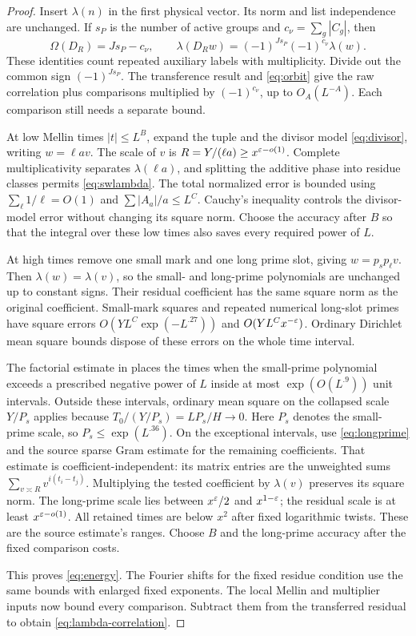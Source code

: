 \begin{proof}
Insert $\lambda(n)$ in the first physical vector. Its norm and
list independence are unchanged. If $s_P$ is the number of active
groups and $c_\nu=\sum_g|C_g|$, then
\[
 \Omega(D_R)=Js_P-c_\nu,\qquad
 \lambda(D_Rw)=(-1)^{Js_P}(-1)^{c_\nu}\lambda(w).
\]
These identities count repeated auxiliary labels with multiplicity.
Divide out the common sign $(-1)^{Js_P}$. The transference result
and \eqref{eq:orbit} give the raw correlation plus comparisons
multiplied by $(-1)^{c_\nu}$, up to $O_A(L^{-A})$.
Each comparison still needs a separate bound.

At low Mellin times $|t|\leq L^B$, expand the tuple and the divisor
model \eqref{eq:divisor}, writing $w=\ell av$.
The scale of $v$ is $R=Y/(\ell a)\geq x^{\varepsilon-o(1)}$.
Complete multiplicativity separates $\lambda(\ell a)$, and splitting
the additive phase into residue classes permits \eqref{eq:swlambda}.
The total normalized error is bounded using
$\sum_{\boldsymbol\ell}1/\ell=O(1)$ and
$\sum|A_a|/a\leq L^C$. Cauchy's inequality controls the divisor-model
error without changing its square norm. Choose the accuracy after
$B$ so that the integral over these low times also saves every
required power of $L$.

At high times remove one small mark and one long prime slot, giving
$w=p_s p_\ell v$. Then
$\lambda(w)=\lambda(v)$, so the small- and long-prime polynomials
are unchanged up to constant signs. Their residual coefficient
has the same square norm as the original coefficient. Small-mark
squares and repeated numerical long-slot primes have square errors
$O(YL^C\exp(-L^{.27}))$ and $O(YL^Cx^{-\varepsilon})$. Ordinary Dirichlet
mean square bounds dispose of these errors on the whole time interval.

The factorial estimate in \cite[Section 6]{D} places the times when
the small-prime polynomial exceeds a prescribed negative power of
$L$ inside at most $\exp(O(L^{.9}))$ unit intervals. Outside these
intervals, ordinary mean square on the collapsed scale $Y/P_s$
applies because $T_0/(Y/P_s)=LP_s/H\to0$. Here $P_s$ denotes the
small-prime scale, so $P_s\leq\exp(L^{.36})$.
On the exceptional intervals, use \eqref{eq:longprime} and the
source sparse Gram estimate for the remaining coefficients. That
estimate is coefficient-independent: its matrix entries are the
unweighted sums $\sum_{v\asymp R}v^{i(t_i-t_j)}$. Multiplying the
tested coefficient by $\lambda(v)$ preserves its square norm.
The long-prime scale lies between $x^\varepsilon/2$ and $x^{1-\varepsilon}$;
the residual scale is at least $x^{\varepsilon-o(1)}$. All retained times
are below $x^2$ after fixed logarithmic twists. These are the source
estimate's ranges. Choose $B$ and the long-prime accuracy after the
fixed comparison costs.

This proves \eqref{eq:energy}. The Fourier shifts for the fixed
residue condition use the same bounds with enlarged fixed exponents.
The local Mellin and multiplier inputs now bound every comparison.
Subtract them from the transferred residual to obtain
\eqref{eq:lambda-correlation}.
\end{proof}

